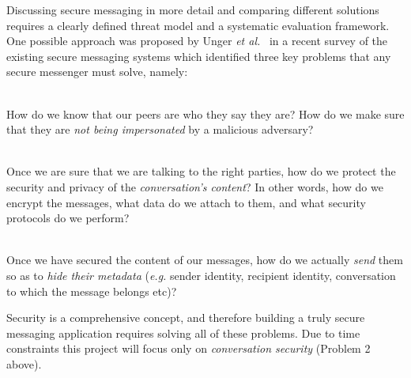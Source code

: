 \documentclass[a4paper, twoside, 12pt]{report}
\begin{document}
Discussing secure messaging in more detail and comparing different solutions requires a clearly defined threat model and a systematic evaluation framework. One possible approach was proposed by Unger \textit{et al.}~\cite{unger2015sok} in a recent survey of the existing secure messaging systems which identified three key problems that any secure messenger must solve, namely:


\begin{description}[labelindent=0.5cm, leftmargin=1.3cm, rightmargin=0.5cm]
    \item[Problem 1: Trust Establishment]\hfill \\
        How do we know that our peers are who they say they are? How do we make sure that they are \emph{not being impersonated} by a malicious adversary?
    \item[Problem 2: Conversation Security]\hfill \\
        Once we are sure that we are talking to the right parties, how do we protect the security and privacy of the \emph{conversation's content}? In other words, how do we encrypt the messages, what data do we attach to them, and what security protocols do we perform?
    \item[Problem 3: Transport Privacy]\hfill \\
        Once we have secured the content of our messages, how do we actually \emph{send} them so as to \emph{hide their metadata} (\textit{e.g.} sender identity, recipient identity, conversation to which the message belongs etc)?
\end{description}
Security is a comprehensive concept, and therefore building a truly secure messaging application requires solving all of these problems. Due to time constraints this project will focus only on \emph{conversation security} (Problem 2 above).
\end{document}

